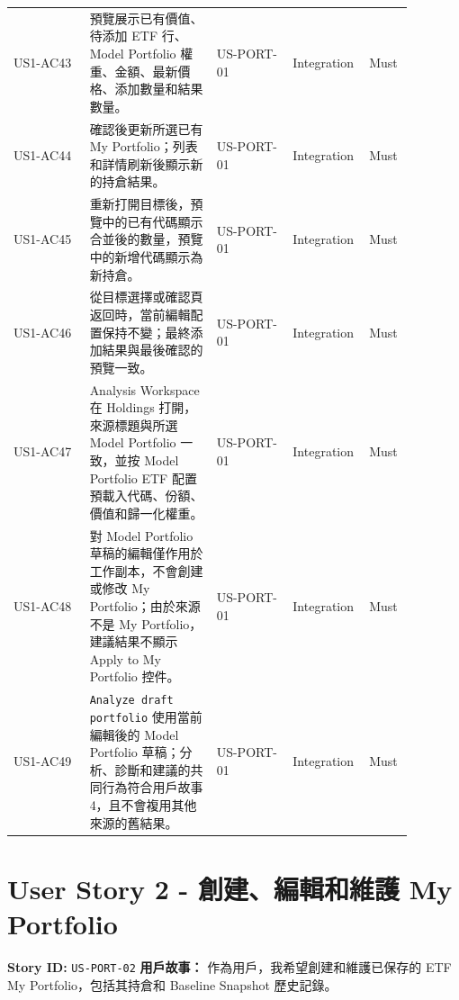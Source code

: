 \begin{longtable}{L{0.18\linewidth}L{0.30\linewidth}L{0.18\linewidth}L{0.12\linewidth}L{0.10\linewidth}}
US1-AC43 & 預覽展示已有價值、待添加 ETF 行、Model Portfolio 權重、金額、最新價格、添加數量和結果數量。 & US-PORT-01 & Integration & Must \\
US1-AC44 & 確認後更新所選已有 My Portfolio；列表和詳情刷新後顯示新的持倉結果。 & US-PORT-01 & Integration & Must \\
US1-AC45 & 重新打開目標後，預覽中的已有代碼顯示合並後的數量，預覽中的新增代碼顯示為新持倉。 & US-PORT-01 & Integration & Must \\
US1-AC46 & 從目標選擇或確認頁返回時，當前編輯配置保持不變；最終添加結果與最後確認的預覽一致。 & US-PORT-01 & Integration & Must \\
US1-AC47 & Analysis Workspace 在 Holdings 打開，來源標題與所選 Model Portfolio 一致，並按 Model Portfolio ETF 配置預載入代碼、份額、價值和歸一化權重。 & US-PORT-01 & Integration & Must \\
US1-AC48 & 對 Model Portfolio 草稿的編輯僅作用於工作副本，不會創建或修改 My Portfolio；由於來源不是 My Portfolio，建議結果不顯示 Apply to My Portfolio 控件。 & US-PORT-01 & Integration & Must \\
US1-AC49 & \texttt{Analyze draft portfolio} 使用當前編輯後的 Model Portfolio 草稿；分析、診斷和建議的共同行為符合用戶故事 4，且不會複用其他來源的舊結果。 & US-PORT-01 & Integration & Must \\
\bottomrule
\end{longtable}
\endgroup
\prdhr
\hypertarget{us-port-02}{}
\section{User Story 2 - 創建、編輯和維護 My Portfolio}
\textbf{Story ID:} \texttt{US-PORT-02}
\textbf{用戶故事：} 作為用戶，我希望創建和維護已保存的 ETF My Portfolio，包括其持倉和 Baseline Snapshot 歷史記錄。
